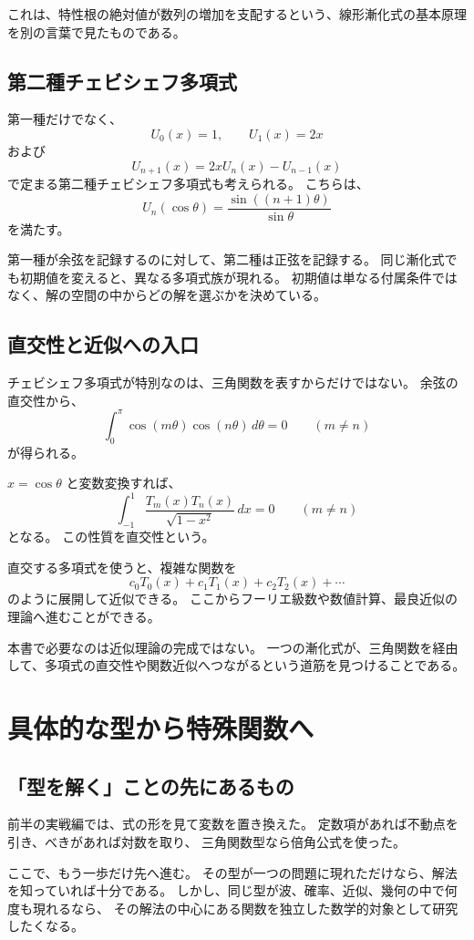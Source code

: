 これは、特性根の絶対値が数列の増加を支配するという、線形漸化式の基本原理を別の言葉で見たものである。

\subsection{第二種チェビシェフ多項式}

第一種だけでなく、\[
  U_0(x)=1,\qquad U_1(x)=2x
\]
および
\[
  U_{n+1}(x)=2xU_n(x)-U_{n-1}(x)
\]
で定まる第二種チェビシェフ多項式も考えられる。
こちらは、
\[
  U_n(\cos\theta)
  =\frac{\sin((n+1)\theta)}{\sin\theta}
\]
を満たす。

第一種が余弦を記録するのに対して、第二種は正弦を記録する。
同じ漸化式でも初期値を変えると、異なる多項式族が現れる。
初期値は単なる付属条件ではなく、解の空間の中からどの解を選ぶかを決めている。

\subsection{直交性と近似への入口}

チェビシェフ多項式が特別なのは、三角関数を表すからだけではない。
余弦の直交性から、
\[
  \int_0^\pi\cos(m\theta)\cos(n\theta)\,d\theta=0
  \qquad(m\neq n)
\]
が得られる。

$x=\cos\theta$ と変数変換すれば、
\[
  \int_{-1}^{1}
  \frac{T_m(x)T_n(x)}{\sqrt{1-x^2}}\,dx=0
  \qquad(m\neq n)
\]
となる。
この性質を直交性という。

直交する多項式を使うと、複雑な関数を
\[
  c_0T_0(x)+c_1T_1(x)+c_2T_2(x)+\cdots
\]
のように展開して近似できる。
ここからフーリエ級数や数値計算、最良近似の理論へ進むことができる。

本書で必要なのは近似理論の完成ではない。
一つの漸化式が、三角関数を経由して、多項式の直交性や関数近似へつながるという道筋を見つけることである。

\clearpage
\section{具体的な型から特殊関数へ}

\subsection{「型を解く」ことの先にあるもの}

前半の実戦編では、式の形を見て変数を置き換えた。
定数項があれば不動点を引き、べきがあれば対数を取り、
三角関数型なら倍角公式を使った。

ここで、もう一歩だけ先へ進む。
その型が一つの問題に現れただけなら、解法を知っていれば十分である。
しかし、同じ型が波、確率、近似、幾何の中で何度も現れるなら、
その解法の中心にある関数を独立した数学的対象として研究したくなる。

